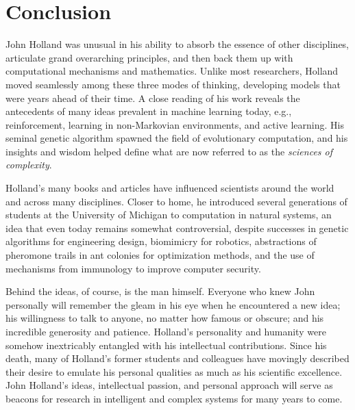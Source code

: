 \documentclass{sig-alternate}
\begin{document}


\section{Conclusion}

John Holland was unusual in his ability to absorb the essence of other
disciplines, articulate grand overarching
principles, and then back them up with computational mechanisms and
mathematics.  Unlike most researchers, Holland moved seamlessly among these
three modes of thinking, developing models that were years ahead of their time.  A
close reading of his work reveals the antecedents of many ideas prevalent in
machine learning today, e.g., reinforcement, learning in non-Markovian
environments, and active learning.   His seminal genetic algorithm
spawned the field of evolutionary computation, and his insights
and wisdom helped define what are now referred to as the
\emph{sciences of complexity}.   

Holland's many books and articles have influenced scientists around
the world and across many disciplines.  Closer to home, he introduced
several generations of students at the University of Michigan to
computation in natural systems, an idea that even today remains
somewhat controversial, despite successes in genetic algorithms for
engineering design, biomimicry for robotics, abstractions of pheromone
trails in ant colonies for optimization methods, and the use of
mechanisms from immunology to improve computer security.

Behind the ideas, of course, is the man himself.   Everyone who knew
John personally will remember the gleam in his eye when he
encountered a new idea; his willingness to talk to anyone, no matter
how famous or obscure; and his incredible generosity and patience.
Holland's personality and humanity were somehow inextricably entangled
with his intellectual contributions.  Since his death, many of
Holland's former students and colleagues have movingly described their
desire to emulate his personal qualities as much as his scientific
excellence.  John Holland's ideas, intellectual passion, and personal approach will serve as
beacons for research in intelligent and complex systems for many
years to come. 
\end{document}
